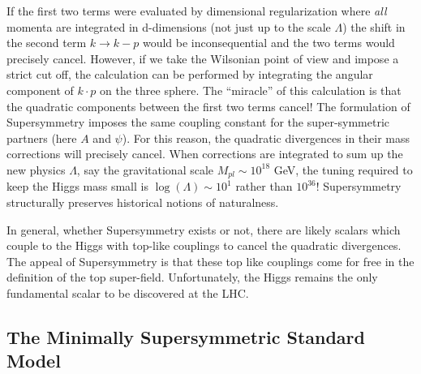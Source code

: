 If the first two terms were evaluated  by dimensional regularization where
 \textit{all} momenta are integrated in d-dimensions (not just up to the scale $\Lambda$) the shift in the second term $k \rightarrow k-p$ would be inconsequential and the two terms would precisely cancel. However, if we take the Wilsonian
 point of view  and impose a strict cut off, the calculation can be performed by integrating the angular component of $k\cdot p$ on the three sphere. 
The ``miracle'' of this calculation is that the quadratic components 
between the first two terms cancel! The formulation of Supersymmetry imposes 
the same coupling constant for the super-symmetric partners (here $A$ and $\psi$). For this reason,
the quadratic divergences in their mass corrections will precisely cancel. When corrections 
are integrated to sum up the new physics $\Lambda$, say the
 gravitational scale $M_{pl}\sim 10^{18}$ GeV, the tuning required to keep the Higgs mass small is $\log(\Lambda)\sim 10^1$ rather than $10^{36}$! 
 Supersymmetry structurally preserves historical notions of naturalness.

In general, whether Supersymmetry exists or not, there are likely scalars which
couple to the Higgs with top-like couplings to cancel the quadratic divergences. The appeal of Supersymmetry is that these top like couplings come for free in the definition of the top super-field. 
Unfortunately, the Higgs remains the only fundamental scalar to be discovered at the LHC.



\subsection{The Minimally Supersymmetric Standard Model}


